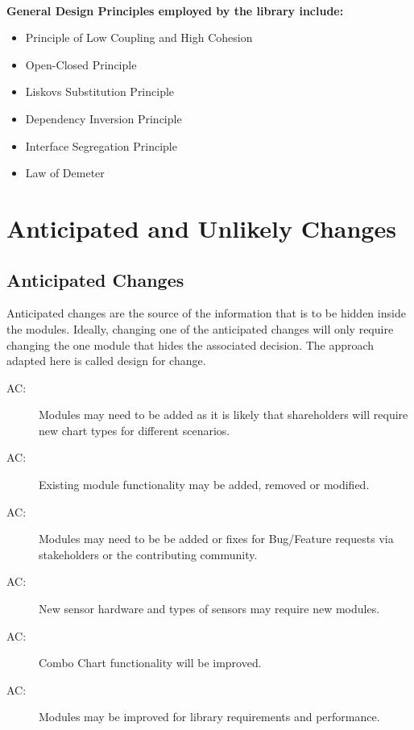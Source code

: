 \documentclass[12pt, titlepage]{article}
\newcounter{acnum}
\newcommand{\actheacnum}{AC\theacnum}
\begin{document}
\\
\textbf{General Design Principles employed by the library include:}
\begin{itemize}
    \item Principle of Low Coupling and High Cohesion 
    \item Open-Closed Principle 
    \item Liskovs Substitution Principle
    \item Dependency Inversion Principle
    \item Interface Segregation Principle
    \item Law of Demeter
\end{itemize}

\section{Anticipated and Unlikely Changes}

\subsection{Anticipated Changes}
Anticipated changes are the source of the information that is to be hidden inside the modules.
Ideally, changing one of the anticipated changes will only require changing the one module
that hides the associated decision. The approach adapted here is called design for change.

\begin{description}
\item[ \actheacnum \label{acFeatureAddition}:] Modules may need to be added as it is likely that shareholders will require new chart types for different scenarios.
\item[ \actheacnum \label{acFeatureRequests}:] Existing module functionality may be added, removed or modified. 
\item[ \actheacnum \label{acFeatureRequests}:] Modules may need to be be added or fixes for Bug/Feature requests via stakeholders or the contributing community.
\item[ \actheacnum \label{acFeatureRequests}:] New sensor hardware and types of sensors may require new modules.
\item[ \actheacnum \label{acFeatureRequests}:] Combo Chart functionality will be improved.
\item[ \actheacnum \label{acFeatureRequests}:] Modules may be improved for library requirements and performance.
\end{description}
\end{document}
